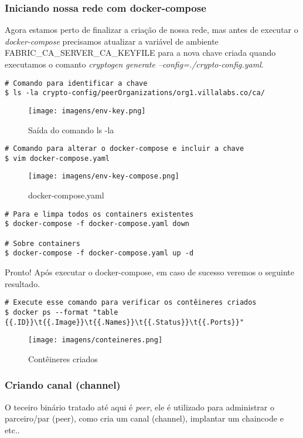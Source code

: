 \documentclass[a4paper,11pt]{article}
\begin{document}
\subsubsection{Iniciando nossa rede com docker-compose}
Agora estamos perto de finalizar a criação de nossa rede, mas antes de executar o \textit{docker-compose} precisamos atualizar a variável de ambiente FABRIC\_CA\_SERVER\_CA\_KEYFILE para a nova chave criada quando executamos o comanto \textit{cryptogen generate --config=./crypto-config.yaml}.

\begin{lstlisting}
# Comando para identificar a chave
$ ls -la crypto-config/peerOrganizations/org1.villalabs.co/ca/
\end{lstlisting}
\begin{figure}[H]
  \centering
  \texttt{[image: imagens/env-key.png]}
  \caption{Saída do comando ls -la}
\end{figure}

\begin{lstlisting}
# Comando para alterar o docker-compose e incluir a chave 
$ vim docker-compose.yaml
\end{lstlisting}
\begin{figure}[H]
  \centering
  \texttt{[image: imagens/env-key-compose.png]}
  \caption{docker-compose.yaml}
\end{figure}

\begin{lstlisting}
# Para e limpa todos os containers existentes
$ docker-compose -f docker-compose.yaml down

# Sobre containers
$ docker-compose -f docker-compose.yaml up -d
\end{lstlisting}

Pronto! Após executar o docker-compose, em caso de sucesso veremos o seguinte resultado.
\begin{lstlisting}
# Execute esse comando para verificar os contêineres criados
$ docker ps --format "table {{.ID}}\t{{.Image}}\t{{.Names}}\t{{.Status}}\t{{.Ports}}"
\end{lstlisting}
\begin{figure}[H]
  \centering
  \texttt{[image: imagens/conteineres.png]}
  \caption{Contêineres criados}
\end{figure}

\subsubsection{Criando canal (channel)}
O teceiro binário tratado até aqui é \textit{peer}, ele é utilizado para administrar o parceiro/par (peer), como cria um canal (channel), implantar um chaincode e etc..
\end{document}
